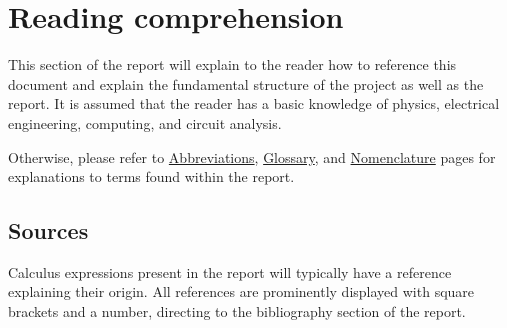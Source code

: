 \chapter*{Reading comprehension} \label{cha:report_structure} \thispagestyle{front}
This section of the report will explain to the reader how to reference this document and explain the fundamental structure of the project as well as the report. It is assumed that the reader has a basic knowledge of physics, electrical engineering, computing, and circuit analysis.

Otherwise, please refer to \hyperref[cha:abbr]{Abbreviations}, \hyperref[cha:glos]{Glossary}, and \hyperref[cha:nomenclature]{Nomenclature} pages for explanations to terms found within the report.


\section*{Sources}
Calculus expressions present in the report will typically have a reference explaining their origin. All references are prominently displayed with square brackets and a number, directing to the bibliography section of the report.

